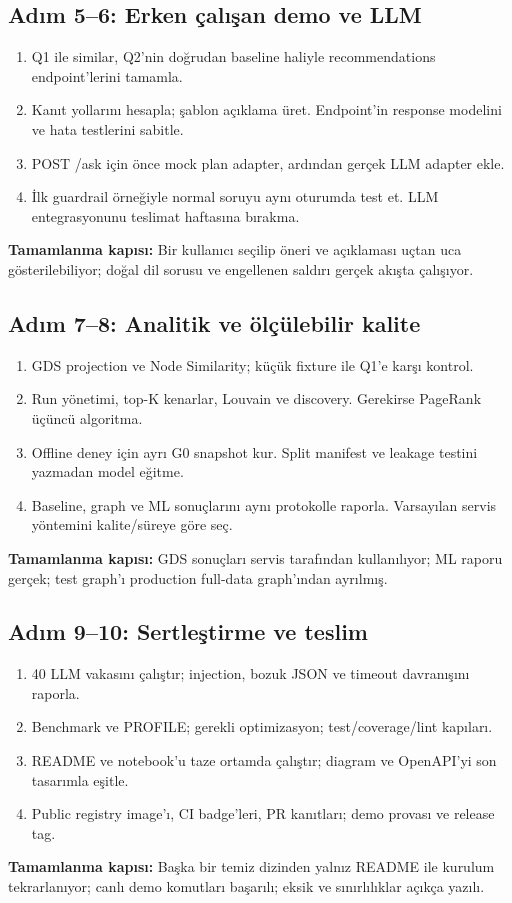 \documentclass[11pt,a4paper]{article}
\newcommand{\gate}[1]{\par\smallskip\noindent\colorbox{pale}{\parbox{0.96\linewidth}{\textbf{Tamamlanma kapısı:} #1}}\par\smallskip}
\begin{document}
\subsection{Adım 5--6: Erken çalışan demo ve LLM}
\begin{enumerate}
\item Q1 ile similar, Q2'nin doğrudan baseline haliyle recommendations endpoint'lerini tamamla.
\item Kanıt yollarını hesapla; şablon açıklama üret. Endpoint'in response modelini ve hata testlerini sabitle.
\item POST /ask için önce mock plan adapter, ardından gerçek LLM adapter ekle.
\item İlk guardrail örneğiyle normal soruyu aynı oturumda test et. LLM entegrasyonunu teslimat haftasına bırakma.
\end{enumerate}
\gate{Bir kullanıcı seçilip öneri ve açıklaması uçtan uca gösterilebiliyor; doğal dil sorusu ve engellenen saldırı gerçek akışta çalışıyor.}

\subsection{Adım 7--8: Analitik ve ölçülebilir kalite}
\begin{enumerate}
\item GDS projection ve Node Similarity; küçük fixture ile Q1'e karşı kontrol.
\item Run yönetimi, top-K kenarlar, Louvain ve discovery. Gerekirse PageRank üçüncü algoritma.
\item Offline deney için ayrı G0 snapshot kur. Split manifest ve leakage testini yazmadan model eğitme.
\item Baseline, graph ve ML sonuçlarını aynı protokolle raporla. Varsayılan servis yöntemini kalite/süreye göre seç.
\end{enumerate}
\gate{GDS sonuçları servis tarafından kullanılıyor; ML raporu gerçek; test graph'ı production full-data graph'ından ayrılmış.}

\subsection{Adım 9--10: Sertleştirme ve teslim}
\begin{enumerate}
\item 40 LLM vakasını çalıştır; injection, bozuk JSON ve timeout davranışını raporla.
\item Benchmark ve PROFILE; gerekli optimizasyon; test/coverage/lint kapıları.
\item README ve notebook'u taze ortamda çalıştır; diagram ve OpenAPI'yi son tasarımla eşitle.
\item Public registry image'ı, CI badge'leri, PR kanıtları; demo provası ve release tag.
\end{enumerate}
\gate{Başka bir temiz dizinden yalnız README ile kurulum tekrarlanıyor; canlı demo komutları başarılı; eksik ve sınırlılıklar açıkça yazılı.}
\end{document}

